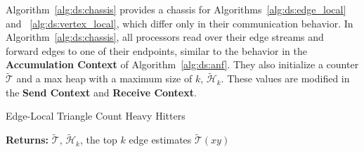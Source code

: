 \documentclass{vldb}
\newcommand{\algoname}[1]{\textnormal{\textsc{#1}}}
\begin{document}
Algorithm~\ref{alg:ds:chassis} provides a chassis for Algorithms~\ref{alg:ds:edge_local}  and ~\ref{alg:ds:vertex_local}, which differ only in their communication behavior. 
In Algorithm~\ref{alg:ds:chassis}, all processors read over their edge streams and forward edges to one of their endpoints, similar to the behavior in the \textbf{Accumulation Context} of Algorithm~\ref{alg:ds:anf}.
They also initialize a counter $\widetilde{\mathcal{T}}$ and a max heap with a maximum size of $k$, $\widetilde{\mathcal{H}}_k$. 
These values are modified in the \textbf{Send Context} and \textbf{Receive Context}.






\begin{algorithm}[t] 
\caption{Edge-Local Triangle Count Heavy Hitters}\label{alg:ds:edge_local}
\begin{flushleft}
        \textbf{Returns:} $\widetilde{\mathcal{T}}$, $\widetilde{\mathcal{H}}_k$, the top $k$ edge estimates $\widetilde{\mathcal{T}}(xy)$
\end{flushleft}
\begin{flushleft}
\begin{algorithmic}[1]

\end{algorithmic}
\end{flushleft}
\end{algorithm}
\end{document}
